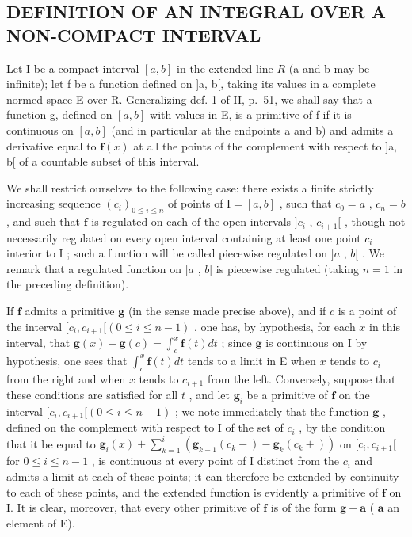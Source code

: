 \subsection{DEFINITION OF AN INTEGRAL OVER A NON-COMPACT INTERVAL}

Let I be a compact interval \([a, b]\) in the extended line \(\overline{R}\) (a and b may be infinite); let f be a function defined on {]}a, b{[}, taking its values in a complete normed space E over R. Generalizing def. 1 of II, p.~51, we shall say that a function g, defined on \([a, b]\) with values in E, is a primitive of f if it is continuous on \([a, b]\) (and in particular at the endpoints a and b) and admits a derivative equal to \(\mathbf{f}(x)\) at all the points of the complement with respect to {]}a, b{[} of a countable subset of this interval.

We shall restrict ourselves to the following case: there exists a finite strictly increasing sequence \((c_i)_{0\leqslant i\leqslant n}\) of points of \(\mathrm{I} = [a,b]\) , such that \(c_0 = a\) , \(c_n = b\) , and such that \(\mathbf{f}\) is regulated on each of the open intervals \(]c_i\) , \(c_{i + 1}[\) , though not necessarily regulated on every open interval containing at least one point \(c_i\) interior to \(\mathrm{I}\) ; such a function will be called piecewise regulated on \(]a\) , \(b[\) . We remark that a regulated function on \(]a\) , \(b[\) is piecewise regulated (taking \(n = 1\) in the preceding definition).

If \(\mathbf{f}\) admits a primitive \(\mathbf{g}\) (in the sense made precise above), and if \(c\) is a point of the interval \([c_i, c_{i+1}[(0 \leqslant i \leqslant n-1)\) , one has, by hypothesis, for each \(x\) in this interval, that \(\mathbf{g}(x) - \mathbf{g}(c) = \int_c^x \mathbf{f}(t) dt\) ; since \(\mathbf{g}\) is continuous on I by hypothesis, one sees that \(\int_c^x \mathbf{f}(t) dt\) tends to a limit in E when \(x\) tends to \(c_i\) from the right and when \(x\) tends to \(c_{i+1}\) from the left. Conversely, suppose that these conditions are satisfied for all \(t\) , and let \(\mathbf{g}_i\) be a primitive of \(\mathbf{f}\) on the interval \([c_i, c_{i+1}[(0 \leqslant i \leqslant n-1)\) ; we note immediately that the function \(\mathbf{g}\) , defined on the complement with respect to I of the set of \(c_i\) , by the condition that it be equal to \(\mathbf{g}_i(x) + \sum_{k=1}^i (\mathbf{g}_{k-1}(c_k-) - \mathbf{g}_k(c_k+))\) on \([c_i, c_{i+1}[\) for \(0 \leqslant i \leqslant n-1\) , is continuous at every point of I distinct from the \(c_i\) and admits a limit at each of these points; it can therefore be extended by continuity to each of these points, and the extended function is evidently a primitive of \(\mathbf{f}\) on I. It is clear, moreover, that every other primitive of \(\mathbf{f}\) is of the form \(\mathbf{g} + \mathbf{a}\) ( \(\mathbf{a}\) an element of E).

